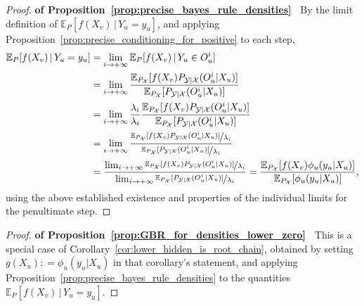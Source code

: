 \documentclass[3p]{elsarticle}
\newcommand{\states}{\mathcal{X}}
\newcommand{\observs}{\mathcal{Y}}
\newcommand{\coloneqq}{:\!=}
\begin{document}
\begin{proof}{\bf of Proposition~\ref{prop:precise_bayes_rule_densities}~}
By the limit definition of $\mathbb{E}_P[f(X_v)\,\vert\,Y_u=y_u]$, and applying Proposition~\ref{prop:precise_conditioning_for_positive} to each step,
\begin{align*}
\mathbb{E}_P[f(X_v)\,\vert\,Y_u=y_u] &= \lim_{i\to+\infty} \mathbb{E}_P[f(X_v)\,\vert\,Y_u\in O_u^i] \\
 &= \lim_{i\to+\infty} \frac{\mathbb{E}_{P_\states}[f(X_v)P_{\observs\vert\states}(O_u^i\vert X_u)]}{\mathbb{E}_{P_\states}[P_{\observs\vert\states}(O_u^i\vert X_u)]} \\
 &= \lim_{i\to+\infty} \frac{\lambda_i}{\lambda_i}\frac{\mathbb{E}_{P_\states}[f(X_v)P_{\observs\vert\states}(O_u^i\vert X_u)]}{\mathbb{E}_{P_\states}[P_{\observs\vert\states}(O_u^i\vert X_u)]} \\
 &= \lim_{i\to+\infty} \frac{\nicefrac{\mathbb{E}_{P_\states}[f(X_v)P_{\observs\vert\states}(O_u^i\vert X_u)]}{\lambda_i}}{\nicefrac{\mathbb{E}_{P_\states}[P_{\observs\vert\states}(O_u^i\vert X_u)]}{\lambda_i}} \\
 &= \frac{\lim_{i\to+\infty} \nicefrac{\mathbb{E}_{P_\states}[f(X_v)P_{\observs\vert\states}(O_u^i\vert X_u)]}{\lambda_i}}{\lim_{i\to+\infty} \nicefrac{\mathbb{E}_{P_\states}[P_{\observs\vert\states}(O_u^i\vert X_u)]}{\lambda_i}}= \frac{\mathbb{E}_{P_\states}[f(X_v)\phi_u(y_u\vert X_u)]}{\mathbb{E}_{P_\states}[\phi_u(y_u\vert X_u)]},
\end{align*}
using the above established existence and properties of the individual limits for the penultimate step.

\end{proof}





\begin{proof}{\bf of Proposition~\ref{prop:GBR_for_densities_lower_zero}~}
This is a special case of Corollary~\ref{cor:lower_hidden_is_root_chain}, obtained by setting $g(X_u)\coloneqq \phi_u(y_u\vert X_u)$ in that corollary's statement, and applying Proposition~\ref{prop:precise_bayes_rule_densities} to the quantities $\mathbb{E}_P[f(X_v)\,\vert\,Y_u=y_u]$.
\end{proof}
\end{document}
